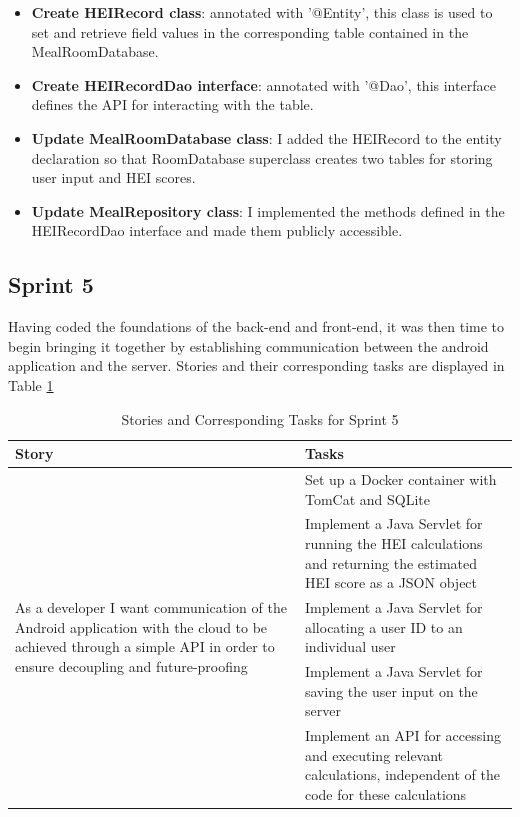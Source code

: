 \documentclass{article}
\begin{document}
\begin{itemize}
    \item \textbf{Create HEIRecord class}: annotated with '@Entity', this class is used to set and retrieve field values in the corresponding table contained in the MealRoomDatabase.
    \item \textbf{Create HEIRecordDao interface}:  annotated with '@Dao', this interface defines the API for interacting with the table.
    \item \textbf{Update MealRoomDatabase class}: I added the HEIRecord to the entity declaration so that RoomDatabase superclass creates two tables for storing user input and HEI scores. 
    \item \textbf{Update MealRepository class}: I implemented the methods defined in the HEIRecordDao interface and made them publicly accessible.
\end{itemize}

\subsection{Sprint 5}
Having coded the foundations of the back-end and front-end, it was then time to begin bringing it together by establishing communication between the android application and the server. Stories and their corresponding tasks are displayed in Table \ref{table:stories_tasks_sprint_5} 

\begin{table}[h]
\centering
\hspace*{-2.1cm}
\begin{tabular}{||m{6cm}|m{9cm}||}
\hline
    Story & Tasks \\ [0.5ex] 
    \hline
    \multirow{5}{\hsize}{As a developer I want communication of the Android application with the cloud to be achieved through a simple API in order to ensure decoupling and future-proofing} 
                                & Set up a Docker container with TomCat and SQLite \\\cline{2-2}
                                & Implement a Java Servlet for running the HEI calculations and returning the estimated HEI score as a JSON object \\\cline{2-2}
                                & Implement a Java Servlet for allocating a user ID to an individual user \\\cline{2-2}
                                & Implement a Java Servlet for saving the user input on the server \\\cline{2-2}
                                & Implement an API for accessing and executing relevant calculations, independent of the code for these calculations \\
\hline
\end{tabular}
\caption{Stories and Corresponding Tasks for Sprint 5}
\label{table:stories_tasks_sprint_5}
\end{table}
\end{document}
